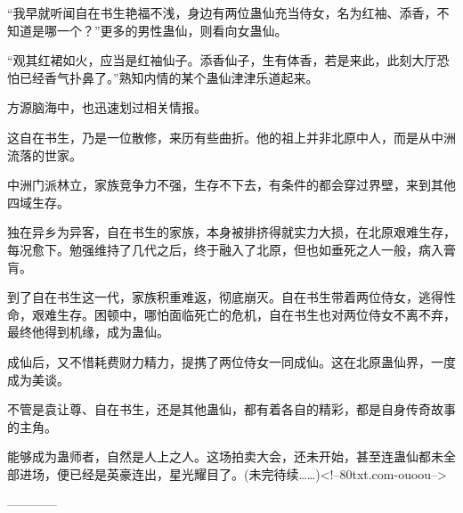 \begin{this_body}
“我早就听闻自在书生艳福不浅，身边有两位蛊仙充当侍女，名为红袖、添香，不知道是哪一个？”更多的男性蛊仙，则看向女蛊仙。

“观其红裙如火，应当是红袖仙子。添香仙子，生有体香，若是来此，此刻大厅恐怕已经香气扑鼻了。”熟知内情的某个蛊仙津津乐道起来。

方源脑海中，也迅速划过相关情报。

这自在书生，乃是一位散修，来历有些曲折。他的祖上并非北原中人，而是从中洲流落的世家。

中洲门派林立，家族竞争力不强，生存不下去，有条件的都会穿过界壁，来到其他四域生存。

独在异乡为异客，自在书生的家族，本身被排挤得就实力大损，在北原艰难生存，每况愈下。勉强维持了几代之后，终于融入了北原，但也如垂死之人一般，病入膏肓。

到了自在书生这一代，家族积重难返，彻底崩灭。自在书生带着两位侍女，逃得性命，艰难生存。困顿中，哪怕面临死亡的危机，自在书生也对两位侍女不离不弃，最终他得到机缘，成为蛊仙。

成仙后，又不惜耗费财力精力，提携了两位侍女一同成仙。这在北原蛊仙界，一度成为美谈。

不管是袁让尊、自在书生，还是其他蛊仙，都有着各自的精彩，都是自身传奇故事的主角。

能够成为蛊师者，自然是人上之人。这场拍卖大会，还未开始，甚至连蛊仙都未全部进场，便已经是英豪连出，星光耀目了。(未完待续……)<!--80txt.com-ouoou-->

------------

\end{this_body}


